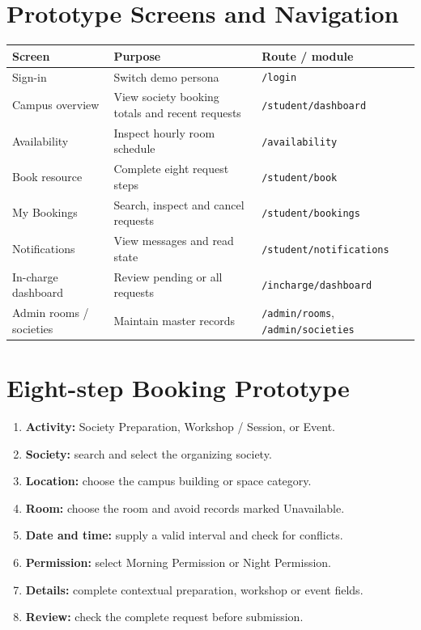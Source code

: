 \documentclass[11pt,a4paper]{report}
\newcommand{\src}[1]{\nolinkurl{#1}}
\begin{document}
\section{Prototype Screens and Navigation}
\begin{tabularx}{\textwidth}{@{}p{37mm}YY@{}}\toprule Screen & Purpose & Route / module\\\midrule Sign-in & Switch demo persona & \src{/login}\\Campus overview & View society booking totals and recent requests & \src{/student/dashboard}\\Availability & Inspect hourly room schedule & \src{/availability}\\Book resource & Complete eight request steps & \src{/student/book}\\My Bookings & Search, inspect and cancel requests & \src{/student/bookings}\\Notifications & View messages and read state & \src{/student/notifications}\\In-charge dashboard & Review pending or all requests & \src{/incharge/dashboard}\\Admin rooms / societies & Maintain master records & \src{/admin/rooms}, \src{/admin/societies}\\\bottomrule\end{tabularx}
\section{Eight-step Booking Prototype}
\begin{enumerate}
\item \textbf{Activity:} Society Preparation, Workshop / Session, or Event.
\item \textbf{Society:} search and select the organizing society.
\item \textbf{Location:} choose the campus building or space category.
\item \textbf{Room:} choose the room and avoid records marked Unavailable.
\item \textbf{Date and time:} supply a valid interval and check for conflicts.
\item \textbf{Permission:} select Morning Permission or Night Permission.
\item \textbf{Details:} complete contextual preparation, workshop or event fields.
\item \textbf{Review:} check the complete request before submission.
\end{enumerate}
\end{document}
